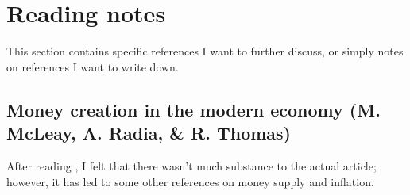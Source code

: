 \section{Reading notes}

This section contains specific references I want to further discuss, or simply notes on references I want to write down.

\subsection{Money creation in the modern economy (M. McLeay, A. Radia, \& R. Thomas)}

After reading \cite{BOE2014}, I felt that there wasn't much substance to the actual article; however, it has led to some other references on money supply and inflation.